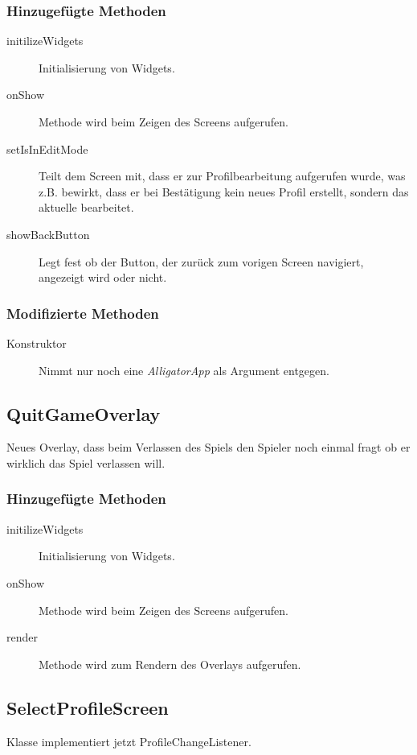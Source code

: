 \subsubsection{Hinzugefügte Methoden}
\begin{description}
\item[initilizeWidgets]
Initialisierung von Widgets.
\item[onShow]
Methode wird beim Zeigen des Screens aufgerufen.
\item[setIsInEditMode]
Teilt dem Screen mit, dass er zur Profilbearbeitung aufgerufen wurde, was z.B. bewirkt, dass er bei Bestätigung kein neues Profil erstellt, sondern das aktuelle bearbeitet.
\item[showBackButton]
Legt fest ob der Button, der zurück zum vorigen Screen navigiert, angezeigt wird oder nicht.
\end{description}

\subsubsection{Modifizierte Methoden}
\begin{description}
\item[Konstruktor]
Nimmt nur noch eine \emph{AlligatorApp} als Argument entgegen.

\end{description}




\subsection{QuitGameOverlay}
Neues Overlay, dass beim Verlassen des Spiels den Spieler noch einmal fragt ob er wirklich das Spiel verlassen will.

\subsubsection{Hinzugefügte Methoden}
\begin{description}
\item[initilizeWidgets]
Initialisierung von Widgets.
\item[onShow]
Methode wird beim Zeigen des Screens aufgerufen.
\item[render]
Methode wird zum Rendern des Overlays aufgerufen.
\end{description}


\subsection{SelectProfileScreen}
Klasse implementiert jetzt ProfileChangeListener.
